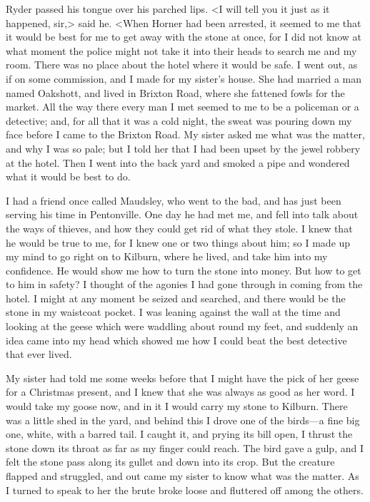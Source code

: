 Ryder passed his tongue over his parched lips. <I will tell you it just as it happened, sir,> said he. <When Horner had been arrested, it seemed to me that it would be best for me to get away with the stone at once, for I did not know at what moment the police might not take it into their heads to search me and my room. There was no place about the hotel where it would be safe. I went out, as if on some commission, and I made for my sister's house. She had married a man named Oakshott, and lived in Brixton Road, where she fattened fowls for the market. All the way there every man I met seemed to me to be a policeman or a detective; and, for all that it was a cold night, the sweat was pouring down my face before I came to the Brixton Road. My sister asked me what was the matter, and why I was so pale; but I told her that I had been upset by the jewel robbery at the hotel. Then I went into the back yard and smoked a pipe and wondered what it would be best to do.

I had a friend once called Maudsley, who went to the bad, and has just been serving his time in Pentonville. One day he had met me, and fell into talk about the ways of thieves, and how they could get rid of what they stole. I knew that he would be true to me, for I knew one or two things about him; so I made up my mind to go right on to Kilburn, where he lived, and take him into my confidence. He would show me how to turn the stone into money. But how to get to him in safety? I thought of the agonies I had gone through in coming from the hotel. I might at any moment be seized and searched, and there would be the stone in my waistcoat pocket. I was leaning against the wall at the time and looking at the geese which were waddling about round my feet, and suddenly an idea came into my head which showed me how I could beat the best detective that ever lived.

My sister had told me some weeks before that I might have the pick of her geese for a Christmas present, and I knew that she was always as good as her word. I would take my goose now, and in it I would carry my stone to Kilburn. There was a little shed in the yard, and behind this I drove one of the birds—a fine big one, white, with a barred tail. I caught it, and prying its bill open, I thrust the stone down its throat as far as my finger could reach. The bird gave a gulp, and I felt the stone pass along its gullet and down into its crop. But the creature flapped and struggled, and out came my sister to know what was the matter. As I turned to speak to her the brute broke loose and fluttered off among the others.

